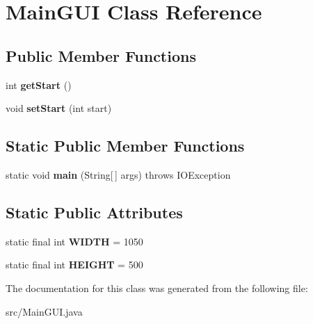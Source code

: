 \hypertarget{classMainGUI}{}\section{Main\+G\+UI Class Reference}
\label{classMainGUI}
\subsection*{Public Member Functions}
\begin{DoxyCompactItemize}
\item 
int {\bfseries get\+Start} ()\hypertarget{classMainGUI_a3d35950de747333a96fa0cca3c38eff5}{}\label{classMainGUI_a3d35950de747333a96fa0cca3c38eff5}

\item 
void {\bfseries set\+Start} (int start)\hypertarget{classMainGUI_abefcabebf411d9ae06fd1bd0c979ab59}{}\label{classMainGUI_abefcabebf411d9ae06fd1bd0c979ab59}

\end{DoxyCompactItemize}
\subsection*{Static Public Member Functions}
\begin{DoxyCompactItemize}
\item 
static void {\bfseries main} (String\mbox{[}$\,$\mbox{]} args)  throws I\+O\+Exception \hypertarget{classMainGUI_a8dd5b61b10beb51baab3664b296c4381}{}\label{classMainGUI_a8dd5b61b10beb51baab3664b296c4381}

\end{DoxyCompactItemize}
\subsection*{Static Public Attributes}
\begin{DoxyCompactItemize}
\item 
static final int {\bfseries W\+I\+D\+TH} = 1050\hypertarget{classMainGUI_a3bdc2df4130838ec598e0b04abd21867}{}\label{classMainGUI_a3bdc2df4130838ec598e0b04abd21867}

\item 
static final int {\bfseries H\+E\+I\+G\+HT} = 500\hypertarget{classMainGUI_aa09eba3beefdff644cbedca2cee85cdd}{}\label{classMainGUI_aa09eba3beefdff644cbedca2cee85cdd}

\end{DoxyCompactItemize}


The documentation for this class was generated from the following file\+:\begin{DoxyCompactItemize}
\item 
src/Main\+G\+U\+I.\+java\end{DoxyCompactItemize}
